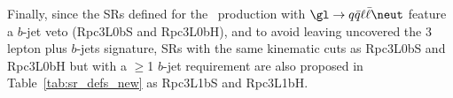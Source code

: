 Finally, since the SRs defined for the \glgl\ production with $\gl\to q\bar q\ell\bar\ell\neut$ feature a $b$-jet veto (Rpc3L0bS and Rpc3L0bH), 
and to avoid leaving uncovered the 3 lepton plus $b$-jets signature, SRs with the same kinematic cuts as Rpc3L0bS and Rpc3L0bH but with a $\geq$1 $b$-jet requirement are also proposed in Table~\ref{tab:sr_defs_new} as Rpc3L1bS and Rpc3L1bH. 
